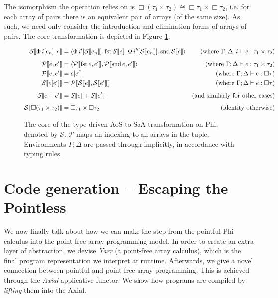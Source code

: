 The isomorphism the operation relies on is $\Box (\tau_1 \times \tau_2) \cong \Box \tau_1 \times \Box \tau_2$, i.e. for each array of pairs there is an equivalent pair of arrays (of the same size). As such, we need only consider the introduction and elimination forms of arrays of pairs. The core transformation is depicted in Figure \ref{fig:aos-to-soa}.

\newcommand{\phisoa}[1]{\mathcal S \left\llbracket {#1} \right\rrbracket}
\newcommand{\phitupleindex}[2]{\mathcal P \left\llbracket {#1}, {#2} \right\rrbracket}

\begin{figure}[h]
    \centering
    \begin{align*}
\phisoa {\phivec{i}{e_n}{e}}
&= \phipair{\phivec{i'}{\phisoa{e_n}}{\phifst{\phisoa{e}}}}{\phivec{i''}{\phisoa{e_n}}{\phisnd{\phisoa{e}}}}
&\text{(where }\Gamma; \Delta, i \vdash e : \phipairtype{\tau_1}{\tau_2} \text{)} \\[0.5em]
\phitupleindex{e}{e'}
&= \phipair{\phitupleindex{\phifst{e}}{e'}}{\phitupleindex{\phisnd{e}}{e'}}
&\text{(where }\Gamma; \Delta \vdash e : \phipairtype{\tau_1}{\tau_2} \text{)} \\
\phitupleindex{e}{e'}
&= e\left[ e' \right]
&\text{(where }\Gamma; \Delta \vdash e : \phivectype{\tau} \text{)} \\
\phisoa{e[e']}
&= \phitupleindex{\phisoa{e}}{\phisoa{e'}}
&\text{(where }\Gamma; \Delta \vdash e : \phivectype{\tau} \text{)} \\[0.5em]
\phisoa{e + e'}
&= \phisoa{e} + \phisoa{e'}
&\text{(and similarly for other cases)} \\[0.5em]
\phisoa{\phivectype{(\phipairtype{\tau_1}{\tau_2}})} &= \phipairtype{\phivectype{\tau_1}}{\phivectype{\tau_2}} &\text{(identity otherwise)}
    \end{align*}
    \caption{The core of the type-driven AoS-to-SoA transformation on Phi, denoted by $\mathcal S$. $\mathcal P$ maps an indexing to all arrays in the tuple. Environments $\Gamma; \Delta$ are passed through implicitly, in accordance with typing rules.}
    \label{fig:aos-to-soa}
\end{figure}

\section{Code generation -- Escaping the Pointless}
\label{escaping-the-pointless}

We now finally talk about how we can make the step from the pointful Phi calculus into the point-free array programming model. In order to create an extra layer of abstraction, we devise \textit{Yarr} (a point-free array calculus), which is the final program representation we interpret at runtime. Afterwards, we give a novel connection between pointful and point-free array programming. This is achieved through the \textit{Axial} applicative functor. We show how programs are compiled by \textit{lifting} them into the Axial.


